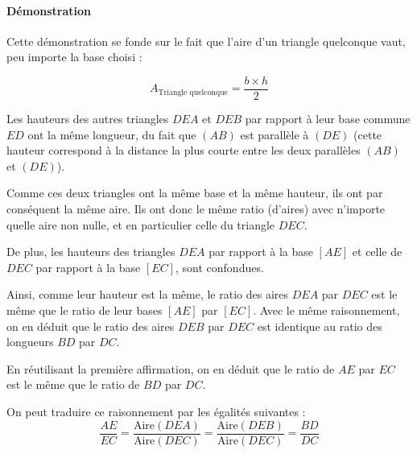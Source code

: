 \documentclass[a4paper, twoside]{article}
\begin{document}
\paragraph*{Démonstration}

Cette démonstration se fonde sur le fait que l'aire
d'un triangle quelconque vaut,
peu importe la base choisi :

$$ A_{\text{Triangle quelconque}} = \frac{b \times h}{2} $$

Les hauteurs des autres triangles $DEA$ et $DEB$ par rapport à
leur base commune $ED$ ont la même longueur,
du fait que $(AB)$ est parallèle à $(DE)$
(cette hauteur correspond à la distance la plus courte
entre les deux parallèles $(AB)$ et $(DE)$).

Comme ces deux triangles ont la même base et la même hauteur,
ils ont par conséquent la même aire.
Ils ont donc le même ratio (d'aires) avec n'importe quelle aire non nulle,
et en particulier celle du triangle $DEC$.

\medbreak

De plus, les hauteurs des triangles
$DEA$ par rapport à la base $[AE]$ et
celle de $DEC$ par rapport à la base $[EC]$,
sont confondues.

Ainsi, comme leur hauteur est la même,
le ratio des aires $DEA$ par $DEC$ est le même que
le ratio de leur bases $[AE]$ par $[EC]$.
Avec le même raisonnement, on en déduit que
le ratio des aires $DEB$ par $DEC$ est identique
au ratio des longueurs $BD$ par $DC$.

\medbreak

En réutilisant la première affirmation,
on en déduit que
le ratio de $AE$ par $EC$ est le même que
le ratio de $BD$ par $DC$.

\medbreak

On peut traduire ce raisonnement par les égalités suivantes :
$$\frac{AE}{EC} = \frac{{\text{Aire}}(DEA)}{{\text{Aire}}(DEC)}
	= \frac{{\text{Aire}}(DEB)}{{\text{Aire}}(DEC)}
	= \frac{BD}{DC}$$

\medbreak
\end{document}
